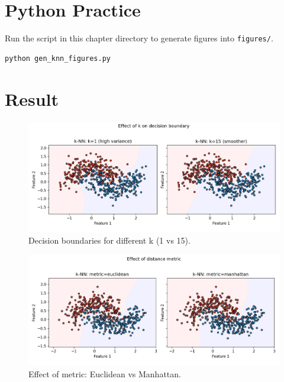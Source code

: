 \documentclass[11pt]{article}
\begin{document}
\section{Python Practice}
Run the script in this chapter directory to generate figures into \texttt{figures/}.
\begin{lstlisting}[style=code,caption={Generate k-NN figures},label={lst:genfigs_knn}]
python gen_knn_figures.py
\end{lstlisting}



\section{Result}
\begin{figure}[H]
  \centering
  \includegraphics[width=0.95\linewidth]{knn_k_compare.png}
  \caption{Decision boundaries for different k (1 vs 15).}
  \label{fig:knn_k}
\end{figure}
\FloatBarrier

\begin{figure}[H]
  \centering
  \includegraphics[width=0.95\linewidth]{knn_metric_compare.png}
  \caption{Effect of metric: Euclidean vs Manhattan.}
  \label{fig:knn_metric}
\end{figure}
\FloatBarrier
\end{document}
